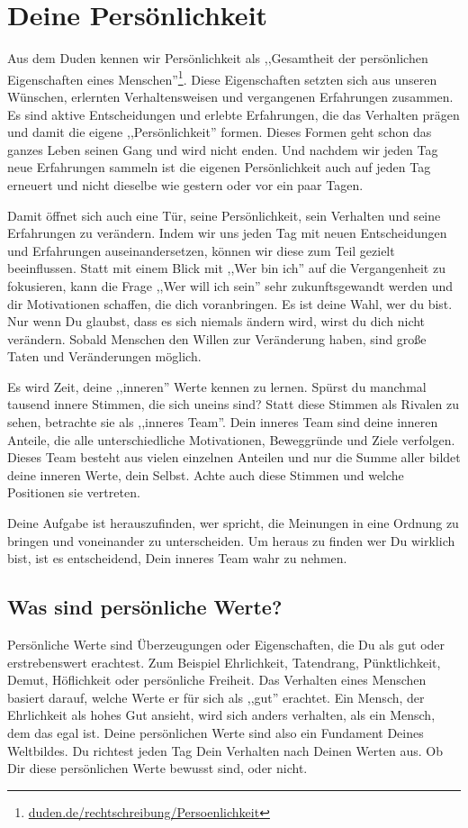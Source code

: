 \documentclass[../Lebensziel.tex]{subfiles}
\begin{document}
\section{Deine Persönlichkeit}
Aus dem Duden kennen wir Persönlichkeit als ,,Gesamtheit der persönlichen Eigenschaften eines Menschen''\footnote{\href{https://www.duden.de/rechtschreibung/Persoenlichkeit}{duden.de/rechtschreibung/Persoenlichkeit}}. Diese Eigenschaften setzten sich aus unseren Wünschen, erlernten Verhaltensweisen und vergangenen Erfahrungen zusammen.
Es sind aktive Entscheidungen und erlebte Erfahrungen, die das Verhalten prägen und damit die eigene ,,Persönlichkeit'' formen. Dieses Formen geht schon das ganzes Leben seinen Gang und wird nicht enden. Und nachdem wir jeden Tag neue Erfahrungen sammeln ist die eigenen Persönlichkeit auch auf jeden Tag erneuert und nicht dieselbe wie gestern oder vor ein paar Tagen.

Damit öffnet sich auch eine Tür, seine Persönlichkeit, sein Verhalten und seine Erfahrungen zu verändern. Indem wir uns jeden Tag mit neuen Entscheidungen und Erfahrungen auseinandersetzen, können wir diese zum Teil gezielt beeinflussen. Statt mit einem Blick mit ,,Wer bin ich'' auf die Vergangenheit zu fokusieren, kann die Frage ,,Wer will ich sein'' sehr zukunftsgewandt werden und dir Motivationen schaffen, die dich voranbringen. Es ist deine Wahl, wer du bist.
Nur wenn Du glaubst, dass es sich niemals ändern wird, wirst du dich nicht verändern. Sobald Menschen den Willen zur Veränderung haben, sind große Taten und Veränderungen möglich.

Es wird Zeit, deine ,,inneren'' Werte kennen zu lernen. Spürst du manchmal tausend innere Stimmen, die sich uneins sind? Statt diese Stimmen als Rivalen zu sehen, betrachte sie als ,,inneres Team''. Dein inneres Team sind deine inneren Anteile, die alle unterschiedliche Motivationen, Beweggründe und Ziele verfolgen. Dieses Team besteht aus vielen einzelnen Anteilen und nur die Summe aller bildet deine inneren Werte, dein Selbst. Achte auch diese Stimmen und welche Positionen sie vertreten.

Deine Aufgabe ist herauszufinden, wer spricht, die Meinungen in eine Ordnung zu bringen und voneinander zu unterscheiden.
Um heraus zu finden wer Du wirklich bist, ist es entscheidend, Dein inneres Team wahr zu nehmen.

\subsection{Was sind persönliche Werte?}
Persönliche Werte sind Überzeugungen oder Eigenschaften, die Du als gut oder erstrebenswert erachtest. Zum Beispiel Ehrlichkeit, Tatendrang, Pünktlichkeit, Demut, Höflichkeit oder persönliche Freiheit. Das Verhalten eines Menschen basiert darauf, welche Werte er für sich als ,,gut'' erachtet. Ein Mensch, der Ehrlichkeit als hohes Gut ansieht, wird sich anders verhalten, als ein Mensch, dem das egal ist.
Deine persönlichen Werte sind also ein Fundament Deines Weltbildes. Du richtest jeden Tag Dein Verhalten nach Deinen Werten aus. Ob Dir diese persönlichen Werte bewusst sind, oder nicht.
\end{document}
